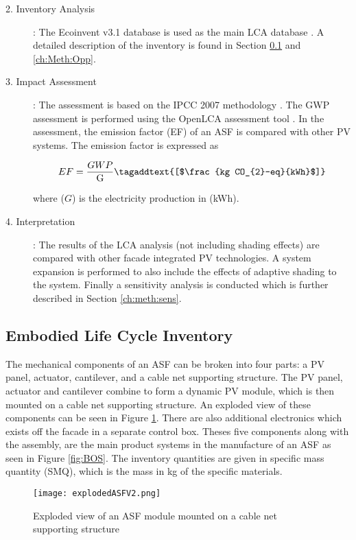 \begin{description}
\item[2. Inventory Analysis]: The Ecoinvent v3.1 database is used as the main LCA database \cite{frischknecht2005ecoinvent}. A detailed description of the inventory is found in Section \ref{ch:meth:Embodied} and \ref{ch:Meth:Opp}.

\item[3. Impact Assessment]: The assessment is based on the IPCC 2007 methodology \cite{solomon2007climate}. The GWP assessment is performed using the OpenLCA assessment tool \cite{ciroth2007ict}. In the assessment, the emission factor (EF) of an ASF is compared with other PV systems. The emission factor is expressed as

\begin{equation}
EF=\frac{GWP}{\mathrm{G}}   
\tagaddtext{[$\frac{kg CO_{2}-eq}{kWh}$]}
\label{eq:EF}
\end{equation}

where ($G$) is the electricity production in (kWh).


\item[4. Interpretation]: The results of the LCA analysis (not including shading effects) are compared with other facade integrated PV technologies. A system expansion is performed to also include the effects of adaptive shading to the system. Finally a sensitivity analysis is conducted which is further described in Section \ref{ch:meth:sens}.


\end{description}

\subsection{Embodied Life Cycle Inventory}
\label{ch:meth:Embodied}


The mechanical components of an ASF can be broken into four parts: a PV panel, actuator, cantilever, and a cable net supporting structure. The PV panel, actuator and cantilever combine to form a dynamic PV module, which is then mounted on a cable net supporting structure. An exploded view of these components can be seen in Figure \ref{fig:explodedView}. There are also additional electronics which exists off the facade in a separate control box. Theses five components along with the assembly, are the main product systems in the manufacture of an ASF as seen in Figure \ref{fig:BOS}. The inventory quantities are given in specific mass quantity (SMQ), which is the mass in kg of the specific materials.


\begin{figure}[H]
\begin{center}
\texttt{[image: explodedASFV2.png]}
\caption{Exploded view of an ASF module mounted on a cable net supporting structure}
\label{fig:explodedView}
\end{center}
\end{figure}

